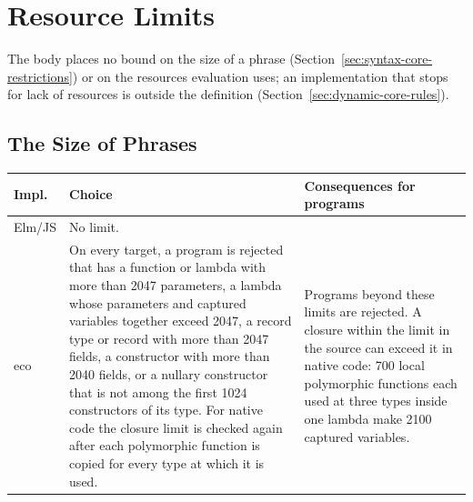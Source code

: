 \section{Resource Limits}\label{sec:appendix-implementation-limits}

The body places no bound on the size of a phrase
(Section~\ref{sec:syntax-core-restrictions}) or on the resources evaluation
uses; an implementation that stops for lack of resources is outside the
definition (Section~\ref{sec:dynamic-core-rules}). %

\subsection{The Size of Phrases}
\begin{center}\small
\begin{tabular}{@{}>{\raggedright\arraybackslash}p{}>{\raggedright\arraybackslash}p{}>{\raggedright\arraybackslash}p{}@{}}
\hline
Impl. & Choice & Consequences for programs\\
\hline
Elm/JS & No limit. & \\
eco & On every target, a program is rejected that has a function or lambda
with more than 2047 parameters, a lambda whose parameters and captured
variables together exceed 2047, a record type or record with more than 2047
fields, a constructor with more than 2040 fields, or a nullary constructor
that is not among the first 1024 constructors of its type. For native code
the closure limit is checked again after each polymorphic function is copied
for every type at which it is used. &
Programs beyond these limits are rejected. A closure within the limit in the
source can exceed it in native code: 700 local polymorphic functions each used
at three types inside one lambda make 2100 captured variables.\\
\hline
\end{tabular}
\end{center}

